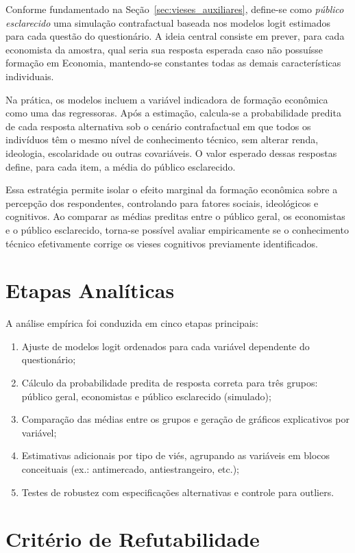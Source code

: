 Conforme fundamentado na Seção~\ref{sec:vieses_auxiliares}, define-se como \textit{público esclarecido} uma simulação contrafactual baseada nos modelos logit estimados para cada questão do questionário. A ideia central consiste em prever, para cada economista da amostra, qual seria sua resposta esperada caso não possuísse formação em Economia, mantendo-se constantes todas as demais características individuais.

Na prática, os modelos incluem a variável indicadora de formação econômica como uma das regressoras. Após a estimação, calcula-se a probabilidade predita de cada resposta alternativa sob o cenário contrafactual em que todos os indivíduos têm o mesmo nível de conhecimento técnico, sem alterar renda, ideologia, escolaridade ou outras covariáveis. O valor esperado dessas respostas define, para cada item, a média do público esclarecido.

Essa estratégia permite isolar o efeito marginal da formação econômica sobre a percepção dos respondentes, controlando para fatores sociais, ideológicos e cognitivos. Ao comparar as médias preditas entre o público geral, os economistas e o público esclarecido, torna-se possível avaliar empiricamente se o conhecimento técnico efetivamente corrige os vieses cognitivos previamente identificados.

\section{Etapas Analíticas}

A análise empírica foi conduzida em cinco etapas principais:
\begin{enumerate}
    \item Ajuste de modelos logit ordenados para cada variável dependente do questionário;
    \item Cálculo da probabilidade predita de resposta correta para três grupos: público geral, economistas e público esclarecido (simulado);
    \item Comparação das médias entre os grupos e geração de gráficos explicativos por variável;
    \item Estimativas adicionais por tipo de viés, agrupando as variáveis em blocos conceituais (ex.: antimercado, antiestrangeiro, etc.);
    \item Testes de robustez com especificações alternativas e controle para outliers.
\end{enumerate}

\section{Critério de Refutabilidade}

